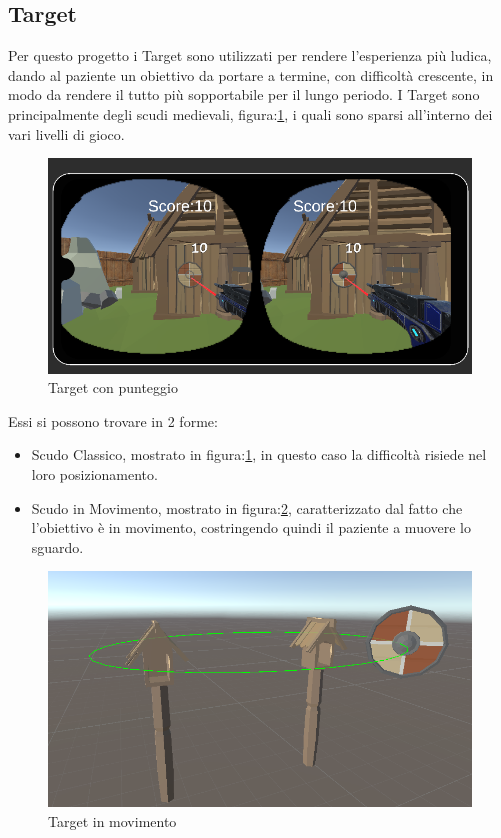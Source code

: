 \documentclass[
a4paper,
cleardoublepage=empty,
headings=twolinechapter,
numbers=autoenddot,
]{scrbook}
\begin{document}
	\subsection{Target}
	Per questo progetto i Target sono utilizzati per rendere l'esperienza più ludica, dando al paziente un obiettivo da portare a termine, con difficoltà crescente, in modo da rendere il tutto più sopportabile per il lungo periodo.
	I Target sono principalmente degli scudi medievali, figura:\ref{fig:target_score}, i quali sono sparsi all'interno dei vari livelli di gioco.
	\begin{figure}[H]
		\centering
		\includegraphics[width=0.7\linewidth]{image/target_score}
		\caption{Target con punteggio}
		\label{fig:target_score}
	\end{figure}
	Essi si possono trovare in 2 forme:
	\begin{itemize}
		\item Scudo Classico, mostrato in figura:\ref{fig:target_score}, in questo caso la difficoltà risiede nel loro posizionamento.
		\item Scudo in Movimento, mostrato in figura:\ref{fig:target_movimento}, caratterizzato dal fatto che l'obiettivo è in movimento, costringendo quindi il paziente a muovere lo sguardo.
	\end{itemize}
	\begin{figure}[H]
		\centering
		\includegraphics[width=0.7\linewidth]{image/target_movimento}
		\caption{Target in movimento}
		\label{fig:target_movimento}
	\end{figure}
\end{document}
